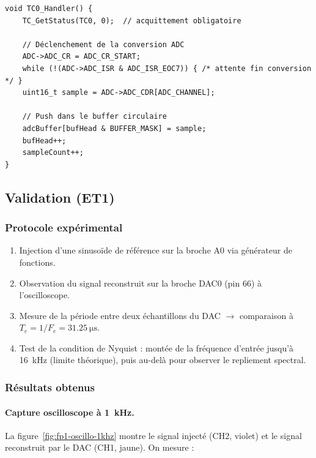 \begin{lstlisting}[style=cpp, caption={Interruption TC0 : lecture ADC et push dans le buffer circulaire.}]
void TC0_Handler() {
    TC_GetStatus(TC0, 0);  // acquittement obligatoire

    // Déclenchement de la conversion ADC
    ADC->ADC_CR = ADC_CR_START;
    while (!(ADC->ADC_ISR & ADC_ISR_EOC7)) { /* attente fin conversion */ }
    uint16_t sample = ADC->ADC_CDR[ADC_CHANNEL];

    // Push dans le buffer circulaire
    adcBuffer[bufHead & BUFFER_MASK] = sample;
    bufHead++;
    sampleCount++;
}
\end{lstlisting}

\subsection{Validation (ET1)}

\subsubsection{Protocole expérimental}

\begin{enumerate}
    \item Injection d'une sinusoïde de référence sur la broche A0 via générateur de fonctions.
    \item Observation du signal reconstruit sur la broche DAC0 (pin 66) à l'oscilloscope.
    \item Mesure de la période entre deux échantillons du DAC $\rightarrow$ comparaison à $T_e = 1/F_e = \SI{31.25}{\micro\second}$.
    \item Test de la condition de Nyquist : montée de la fréquence d'entrée jusqu'à \SI{16}{\kilo\hertz} (limite théorique), puis au-delà pour observer le repliement spectral.
\end{enumerate}

\subsubsection{Résultats obtenus}

\paragraph{Capture oscilloscope à \SI{1}{\kilo\hertz}.} La figure~\ref{fig:fp1-oscillo-1khz} montre le signal injecté (CH2, violet) et le signal reconstruit par le DAC (CH1, jaune). On mesure :

